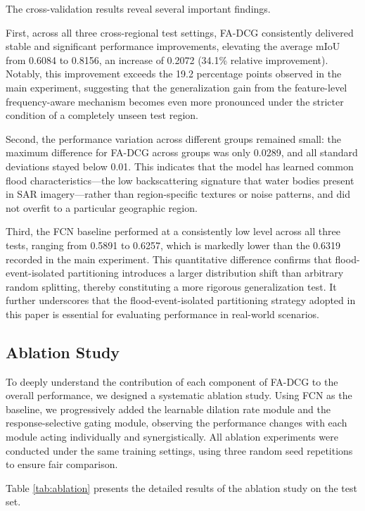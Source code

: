 \documentclass[lettersize,journal]{IEEEtran}
\begin{document}
The cross-validation results reveal several important findings.

First, across all three cross-regional test settings, FA-DCG consistently delivered stable and significant performance improvements, elevating the average mIoU from 0.6084 to 0.8156, an increase of 0.2072 (34.1\% relative improvement). Notably, this improvement exceeds the 19.2 percentage points observed in the main experiment, suggesting that the generalization gain from the feature-level frequency-aware mechanism becomes even more pronounced under the stricter condition of a completely unseen test region.

Second, the performance variation across different groups remained small: the maximum difference for FA-DCG across groups was only 0.0289, and all standard deviations stayed below 0.01. This indicates that the model has learned common flood characteristics---the low backscattering signature that water bodies present in SAR imagery---rather than region-specific textures or noise patterns, and did not overfit to a particular geographic region.

Third, the FCN baseline performed at a consistently low level across all three tests, ranging from 0.5891 to 0.6257, which is markedly lower than the 0.6319 recorded in the main experiment. This quantitative difference confirms that flood-event-isolated partitioning introduces a larger distribution shift than arbitrary random splitting, thereby constituting a more rigorous generalization test. It further underscores that the flood-event-isolated partitioning strategy adopted in this paper is essential for evaluating performance in real-world scenarios.

\subsection{Ablation Study}

To deeply understand the contribution of each component of FA-DCG to the overall performance, we designed a systematic ablation study. Using FCN as the baseline, we progressively added the learnable dilation rate module and the response-selective gating module, observing the performance changes with each module acting individually and synergistically. All ablation experiments were conducted under the same training settings, using three random seed repetitions to ensure fair comparison.

Table \ref{tab:ablation} presents the detailed results of the ablation study on the test set.
\end{document}
